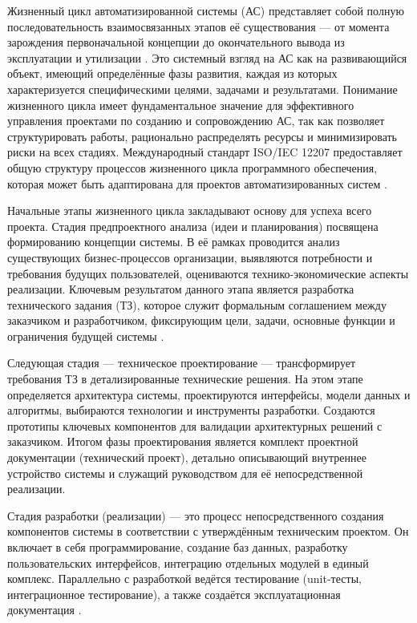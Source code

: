 \documentclass{SibFU-docs}
\begin{document}
Жизненный цикл автоматизированной системы (АС) представляет собой полную последовательность взаимосвязанных этапов её существования — от момента зарождения первоначальной концепции до окончательного вывода из эксплуатации и утилизации \cite{gost-34}. Это системный взгляд на АС как на развивающийся объект, имеющий определённые фазы развития, каждая из которых характеризуется специфическими целями, задачами и результатами. Понимание жизненного цикла имеет фундаментальное значение для эффективного управления проектами по созданию и сопровождению АС, так как позволяет структурировать работы, рационально распределять ресурсы и минимизировать риски на всех стадиях. Международный стандарт ISO/IEC 12207 предоставляет общую структуру процессов жизненного цикла программного обеспечения, которая может быть адаптирована для проектов автоматизированных систем \cite{iso-iec-12207}.


Начальные этапы жизненного цикла закладывают основу для успеха всего проекта. Стадия предпроектного анализа (идеи и планирования) посвящена формированию концепции системы. В её рамках проводится анализ существующих бизнес-процессов организации, выявляются потребности и требования будущих пользователей, оцениваются технико-экономические аспекты реализации. Ключевым результатом данного этапа является разработка технического задания (ТЗ), которое служит формальным соглашением между заказчиком и разработчиком, фиксирующим цели, задачи, основные функции и ограничения будущей системы \cite{swebok}.

Следующая стадия — техническое проектирование — трансформирует требования ТЗ в детализированные технические решения. На этом этапе определяется архитектура системы, проектируются интерфейсы, модели данных и алгоритмы, выбираются технологии и инструменты разработки. Создаются прототипы ключевых компонентов для валидации архитектурных решений с заказчиком. Итогом фазы проектирования является комплект проектной документации (технический проект), детально описывающий внутреннее устройство системы и служащий руководством для её непосредственной реализации.


Стадия разработки (реализации) — это процесс непосредственного создания компонентов системы в соответствии с утверждённым техническим проектом. Он включает в себя программирование, создание баз данных, разработку пользовательских интерфейсов, интеграцию отдельных модулей в единый комплекс. Параллельно с разработкой ведётся тестирование (unit-тесты, интеграционное тестирование), а также создаётся эксплуатационная документация \cite{iso-iec-12207}.
\end{document}

